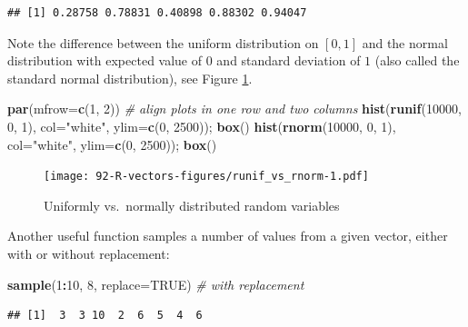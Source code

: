 \documentclass[10pt,b5paper,krantz1]{krantz}
\newenvironment{Shaded}{\begin{snugshade}}{\end{snugshade}}
\newcommand{\CommentTok}[1]{\textcolor[rgb]{0.37,0.37,0.37}{\textit{#1}}}
\newcommand{\DataTypeTok}[1]{\textcolor[rgb]{0.27,0.27,0.27}{#1}}
\newcommand{\DecValTok}[1]{\textcolor[rgb]{0.06,0.06,0.06}{#1}}
\newcommand{\KeywordTok}[1]{\textcolor[rgb]{0.27,0.27,0.27}{\textbf{#1}}}
\newcommand{\NormalTok}[1]{#1}
\newcommand{\OperatorTok}[1]{\textcolor[rgb]{0.43,0.43,0.43}{\textbf{#1}}}
\newcommand{\OtherTok}[1]{\textcolor[rgb]{0.37,0.37,0.37}{#1}}
\newcommand{\StringTok}[1]{\textcolor[rgb]{0.5,0.5,0.5}{#1}}
\begin{document}
\begin{verbatim}
## [1] 0.28758 0.78831 0.40898 0.88302 0.94047
\end{verbatim}

Note the difference between the uniform distribution on \([0,1]\)
and the normal distribution with expected value of \(0\) and standard deviation
of \(1\) (also called the standard normal distribution),
see Figure \ref{fig:runif_vs_rnorm}.

\begin{Shaded}
\begin{Highlighting}[]
\KeywordTok{par}\NormalTok{(}\DataTypeTok{mfrow=}\KeywordTok{c}\NormalTok{(}\DecValTok{1}\NormalTok{, }\DecValTok{2}\NormalTok{)) }\CommentTok{# align plots in one row and two columns}
\KeywordTok{hist}\NormalTok{(}\KeywordTok{runif}\NormalTok{(}\DecValTok{10000}\NormalTok{, }\DecValTok{0}\NormalTok{, }\DecValTok{1}\NormalTok{), }\DataTypeTok{col=}\StringTok{"white"}\NormalTok{, }\DataTypeTok{ylim=}\KeywordTok{c}\NormalTok{(}\DecValTok{0}\NormalTok{, }\DecValTok{2500}\NormalTok{)); }\KeywordTok{box}\NormalTok{()}
\KeywordTok{hist}\NormalTok{(}\KeywordTok{rnorm}\NormalTok{(}\DecValTok{10000}\NormalTok{, }\DecValTok{0}\NormalTok{, }\DecValTok{1}\NormalTok{), }\DataTypeTok{col=}\StringTok{"white"}\NormalTok{, }\DataTypeTok{ylim=}\KeywordTok{c}\NormalTok{(}\DecValTok{0}\NormalTok{, }\DecValTok{2500}\NormalTok{)); }\KeywordTok{box}\NormalTok{()}
\end{Highlighting}
\end{Shaded}

\begin{figure}
\hypertarget{fig:runif_vs_rnorm}{%
\centering
\texttt{[image: 92-R-vectors-figures/runif\_vs\_rnorm-1.pdf]}
\caption{Uniformly vs.~normally distributed random variables}\label{fig:runif_vs_rnorm}
}
\end{figure}

Another useful function samples a number of values from a given vector,
either with or without replacement:

\begin{Shaded}
\begin{Highlighting}[]
\KeywordTok{sample}\NormalTok{(}\DecValTok{1}\OperatorTok{:}\DecValTok{10}\NormalTok{, }\DecValTok{8}\NormalTok{, }\DataTypeTok{replace=}\OtherTok{TRUE}\NormalTok{) }\CommentTok{# with replacement}
\end{Highlighting}
\end{Shaded}

\begin{verbatim}
## [1]  3  3 10  2  6  5  4  6
\end{verbatim}
\end{document}
